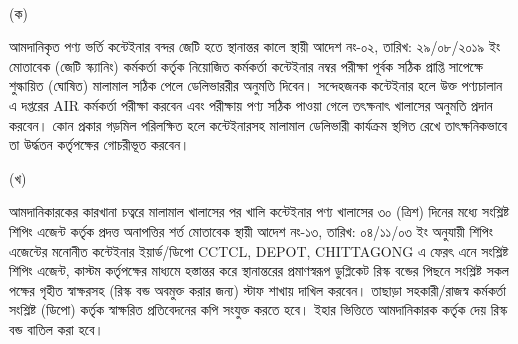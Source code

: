 \documentclass[12pt]{article}
\newcommand{\rdepo}{CCTCL, DEPOT, CHITTAGONG}
\begin{document}
\\
\begin{minipage}[t]{0.04\linewidth}
\hspace{0.5em}
\end{minipage}
\begin{minipage}[t]{0.04\linewidth}
\scriptsize{(ক)}
\end{minipage}
\begin{minipage}[t]{.92\linewidth}
\scriptsize{আমদানিকৃত পণ্য ভর্তি
কন্টেইনার বন্দর জেটি
হতে স্থানান্তর কালে স্থায়ী
আদেশ নং-০২, তারিখ: ২৯/০৮/২০১৯ ইং
মোতাবেক (জেটি স্ক্যানিং)
কর্মকর্তা কর্তৃক
নিয়োজিত কর্মকর্তা
কন্টেইনার
নম্বর পরীক্ষা পূর্বক
সঠিক প্রাপ্তি সাপেক্ষে
শুল্কায়িত (ঘোষিত) মালামাল সঠিক পেলে
ডেলিভাররীর অনুমতি
দিবেন। সন্দেহজনক কন্টেইনার হলে
উক্ত পণ্যচালান এ দপ্তরের AIR কর্মকর্তা
পরীক্ষা করবেন এবং পরীক্ষায় পণ্য সঠিক পাওয়া গেলে
তৎক্ষনাৎ খালাসের অনুমতি প্রদান করবেন।
কোন প্রকার গড়মিল পরিলক্ষিত হলে
কন্টেইনারসহ মালামাল ডেলিভারী কার্যক্রম স্থগিত রেখে
তাৎক্ষনিকভাবে তা উর্দ্ধতন কর্তৃপক্ষের গোচরীভূত করবেন।}
\\
\end{minipage}
\begin{minipage}[t]{0.04\linewidth}
\hspace{0.5em}
\end{minipage}
\begin{minipage}[t]{0.04\linewidth}
\scriptsize{(খ)}
\end{minipage}
\begin{minipage}[t]{0.92\linewidth}
\scriptsize{আমদানিকারকের কারখানা চত্বরে
মালামাল খালাসের পর খালি কন্টেইনার পণ্য খালাসের
৩০ (ত্রিশ) দিনের মধ্যে সংশ্লিষ্ট শিপিং এজেন্ট কর্তৃক
প্রদত্ত অনাপত্তির শর্ত মোতাবেক স্থায়ী
আদেশ নং-১৩, তারিখ: ০৪/১১/০৩ ইং
অনুযায়ী শিপিং এজেন্টের মনোনীত কন্টেইনার
ইয়ার্ড/ডিপো {\rdepo} এ ফেরৎ এনে সংশ্লিষ্ট
শিপিং এজেন্ট, কাস্টম কর্তৃপক্ষের মাধ্যমে হস্তান্তর করে
স্থানান্তরের প্রমাণস্বরূপ ডুপ্লিকেট রিস্ক বন্ডের পিছনে
সংশ্লিষ্ট সকল পক্ষের গৃহীত স্বাক্ষরসহ
(রিস্ক বন্ড অবমুক্ত করার জন্য)
স্টাফ শাখায় দাখিল করবেন।
তাছাড়া সহকারী/রাজস্ব কর্মকর্তা সংশ্লিষ্ট (ডিপো) কর্তৃক
স্বাক্ষরিত প্রতিবেদনের কপি সংযুক্ত করতে হবে।
ইহার ভিত্তিতে আমদানিকারক কর্তৃক দেয়
রিস্ক বন্ড বাতিল করা হবে।}
\\
\\
\\
\\
\\
\\
\end{minipage}
\begin{minipage}[t]{0.60\linewidth}
\hspace{1em}
\end{minipage}
\end{document}
